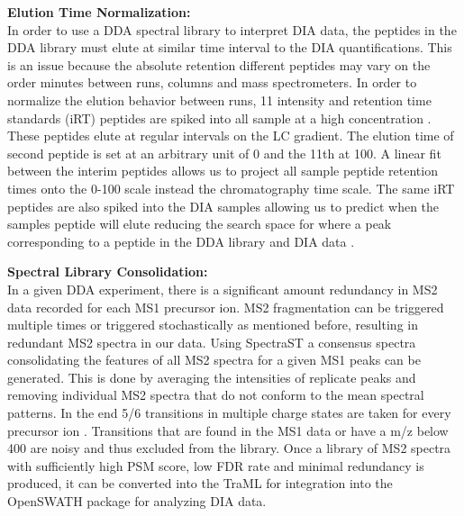 \documentclass[a4paper]{book}
\begin{document}
	\textbf{Elution Time Normalization:}\\
	In order to use a DDA spectral library to interpret DIA data, the peptides in the DDA library must elute at similar time interval to the DIA quantifications. This is an issue because the absolute retention different peptides may vary on the order minutes between runs, columns and mass spectrometers. In order to normalize the elution behavior between runs, 11 intensity and retention time standards (iRT) peptides are spiked into all sample at a high concentration \citep{Bruderer2016HighprecisioniRT}. These peptides elute at regular intervals on the LC gradient. The elution time of second peptide is set at an arbitrary unit of 0 and the 11th at 100. A linear fit between the interim peptides allows us to project all sample peptide retention times onto the 0-100 scale instead the chromatography time scale. The same iRT peptides are also spiked into the DIA samples allowing us to predict when the samples peptide will elute reducing the search space for where a peak corresponding to a peptide in the DDA library and DIA data \citep{Bruderer2016HighprecisioniRT}.
	
	\textbf{Spectral Library Consolidation:}\\
In a given DDA experiment, there is a significant amount redundancy in MS2 data recorded for each MS1 precursor ion. MS2 fragmentation can be triggered multiple times or triggered stochastically as mentioned before, resulting in redundant MS2 spectra in our data. Using SpectraST a consensus spectra consolidating the features of all MS2 spectra for a given MS1 peaks can be generated. This is done by averaging the intensities of replicate peaks and removing individual MS2 spectra that do not conform to the mean spectral patterns\citep{Lam2008BuildingProteomics}. In the end 5/6 transitions in multiple charge states are taken for every precursor ion \citep{Schubert2015BuildingData}. Transitions that are found in the MS1 data or have a m/z below 400 are noisy and thus excluded from the library. Once a library of MS2 spectra with sufficiently high PSM score, low FDR rate and minimal redundancy is produced, it can be converted into the TraML for integration into the OpenSWATH package for analyzing DIA data.
	
\end{document}
